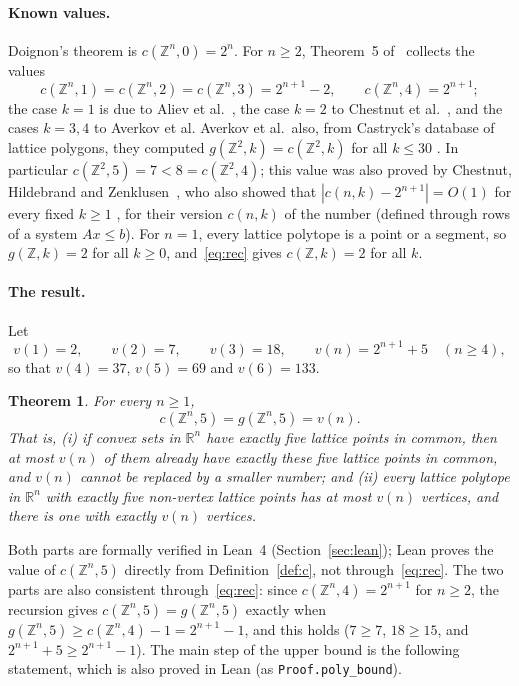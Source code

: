 \documentclass[11pt]{article}
\newtheorem{theorem}{Theorem}
\theoremstyle{definition}
\theoremstyle{remark}
\newcommand{\Z}{\mathbb Z}
\newcommand{\R}{\mathbb R}
\begin{document}
\paragraph{Known values.}
Doignon's theorem is $c(\Z^n,0)=2^n$. For $n\ge2$, Theorem~5
of~\cite{agm} collects the values
\[
c(\Z^n,1)=c(\Z^n,2)=c(\Z^n,3)=2^{n+1}-2,\qquad c(\Z^n,4)=2^{n+1};
\]
the case $k=1$ is due to Aliev et al.~\cite[Theorem~2]{abdl}, the case $k=2$ to
Chestnut et al.~\cite[Proposition~4.5]{chz}, and the cases $k=3,4$ to Averkov
et al. Averkov et al.\ also, from Castryck's database of lattice polygons, they computed
$g(\Z^2,k)=c(\Z^2,k)$ for all $k\le30$ \cite[Figure~3]{agm}. In particular
$c(\Z^2,5)=7<8=c(\Z^2,4)$; this value was also proved by Chestnut,
Hildebrand and Zenklusen~\cite[Section~5, Lemma~5.2 and Figure~1]{chz}, who also showed
that $|c(n,k)-2^{n+1}|=O(1)$ for every fixed $k\ge1$
\cite[Corollary~3.13]{chz}, for their version $c(n,k)$ of the number (defined
through rows of a system $Ax\le b$). For $n=1$, every lattice polytope is a
point or a segment, so $g(\Z,k)=2$ for all $k\ge0$, and~\eqref{eq:rec} gives
$c(\Z,k)=2$ for all $k$.

\paragraph{The result.} Let
\[
v(1)=2,\qquad v(2)=7,\qquad v(3)=18,\qquad v(n)=2^{n+1}+5\quad(n\ge4),
\]
so that $v(4)=37$, $v(5)=69$ and $v(6)=133$.

\begin{theorem}\label{thm:main}
For every $n\ge1$,
\[
c(\Z^n,5)=g(\Z^n,5)=v(n).
\]
That is, (i) if convex sets in $\R^n$ have exactly five lattice points in
common, then at most $v(n)$ of them already have exactly these five lattice points
in common, and $v(n)$ cannot be replaced by a smaller number; and (ii) every
lattice polytope in $\R^n$ with exactly five non-vertex lattice points has at
most $v(n)$ vertices, and there is one with exactly $v(n)$ vertices.
\end{theorem}

Both parts are formally verified in Lean~4 (Section~\ref{sec:lean}); Lean
proves the value of $c(\Z^n,5)$ directly from Definition~\ref{def:c}, not
through~\eqref{eq:rec}. The two parts are also consistent through~\eqref{eq:rec}:
since $c(\Z^n,4)=2^{n+1}$ for $n\ge2$, the recursion gives
$c(\Z^n,5)=g(\Z^n,5)$ exactly when $g(\Z^n,5)\ge c(\Z^n,4)-1=2^{n+1}-1$, and
this holds ($7\ge7$, $18\ge15$, and $2^{n+1}+5\ge2^{n+1}-1$). The main
step of the upper bound is the following statement, which is also proved in
Lean (as \texttt{Proof.poly\_bound}).
\end{document}
